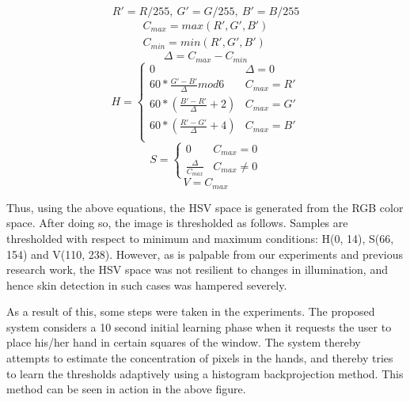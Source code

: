 \documentclass[letterpaper, 11 pt, twoside, conference]{ieeeconf}
\begin{document}
\begin{equation}
  \label{eq:1}
  R' = R/255,\ G' = G/255,\ B' = B/255
\end{equation}
\begin{equation}
  \begin{multlined}
C_{max} = max(R', G', B')\\
C_{min} = min(R', G', B')
  \end{multlined}
\end{equation}
\begin{equation}
  \Delta = C_{max} - C_{min}
\end{equation}
\begin{equation}
   H = \begin{cases} 
            0 & \Delta = 0 \\
   60 * \frac{G'-B'}{\Delta}mod6 & C_{max} = R' \\
     60 * (\frac{B'-R'}{\Delta}+2) & C_{max}=G' \\
     60 * (\frac{R'-G'}{\Delta}+4) & C_{max} = B'\\

         \end{cases}
\end{equation}
\begin{equation}
  S = \begin{cases}
      0 & C_{max} = 0\\
      \frac{\Delta}{C_{max}} & C_{max} \neq 0
  \end{cases}
\end{equation}
\begin{equation}
  V = C_{max}
\end{equation}

Thus, using the above equations, the HSV space is generated from the RGB color space.
After doing so, the image is thresholded as follows. Samples are thresholded with respect
to minimum and maximum conditions: H(0, 14), S(66, 154) and V(110, 238).
However, as is palpable from our experiments and previous research work, the HSV space
was not resilient to changes in illumination, and hence skin detection in such cases
was hampered severely.

As a result of this, some steps were taken in the experiments. The proposed system considers
a 10 second initial learning phase when it requests the user to place his/her hand in certain
squares of the window. The system thereby attempts to estimate the concentration of pixels in the
hands, and thereby tries to learn the thresholds adaptively using a histogram backprojection method.
This method can be seen in action in the above figure. 
\end{document}
